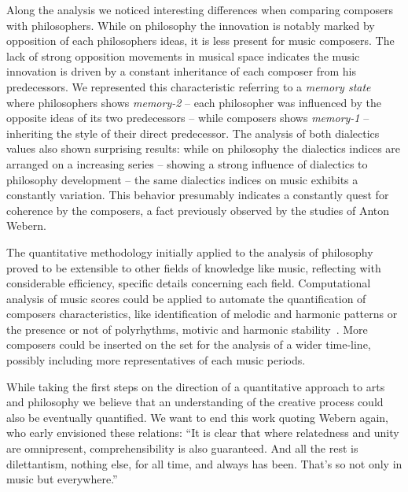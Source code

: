 \documentclass[
 aip,
 jmp,
 amsmath,amssymb,
 reprint,
]{revtex4-1}
\begin{document}
Along the analysis we noticed interesting differences when comparing
composers with philosophers. While on philosophy the
innovation is notably marked by opposition of each philosophers ideas,
it is less present for music composers. The lack of strong
opposition movements in musical space indicates the music innovation is driven by
a constant inheritance of each composer from his predecessors. We
represented this characteristic referring to a \textit{memory state}
where philosophers shows \textit{memory-2} -- each philosopher was
influenced by the opposite ideas of its two predecessors -- while
composers shows \textit{memory-1} -- inheriting the style of their direct
predecessor. 
The
analysis of both dialectics values also shown surprising
results: while on philosophy the dialectics indices are arranged on a
increasing series -- showing a strong influence of
dialectics to philosophy development -- the same dialectics indices on
music exhibits a constantly variation. This behavior presumably indicates a
constantly quest for coherence by the composers, a fact previously observed by
the studies of Anton Webern.

The quantitative methodology initially applied to the analysis of philosophy
proved to be extensible to other fields of knowledge like
music, reflecting with considerable efficiency, specific details
concerning each field. 
Computational analysis of music scores could be
applied to automate the quantification of composers characteristics, like
identification of melodic and harmonic patterns or the presence or not of
polyrhythms, motivic and harmonic stability~\cite{Correa}. More composers could be
inserted on the set for the analysis of a wider time-line, possibly
including more representatives of each music periods. 


While taking the first
steps on the direction of a quantitative approach to arts and philosophy
we believe that an understanding of the creative process could also
be eventually quantified. We want to end this work quoting Webern
again, who early envisioned these relations: ``It is clear that where relatedness and unity are omnipresent,
comprehensibility is also guaranteed. And all the rest is
dilettantism, nothing else, for all time, and always has been. That's
so not only in music but everywhere.''






\end{document}
